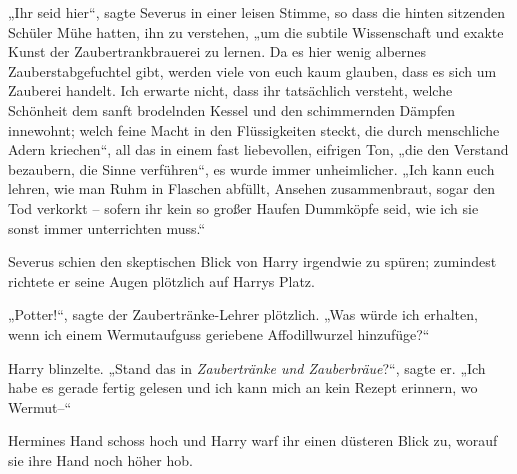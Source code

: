 „Ihr seid hier“, sagte Severus in einer leisen Stimme, so dass die hinten sitzenden Schüler Mühe hatten, ihn zu verstehen, „um die subtile Wissenschaft und exakte Kunst der Zaubertrankbrauerei zu lernen. Da es hier wenig albernes Zauberstabgefuchtel gibt, werden viele von euch kaum glauben, dass es sich um Zauberei handelt. Ich erwarte nicht, dass ihr tatsächlich versteht, welche Schönheit dem sanft brodelnden Kessel und den schimmernden Dämpfen innewohnt; welch feine Macht in den Flüssigkeiten steckt, die durch menschliche Adern kriechen“, all das in einem fast liebevollen, eifrigen Ton, „die den Verstand bezaubern, die Sinne verführen“, es wurde immer unheimlicher. „Ich kann euch lehren, wie man Ruhm in Flaschen abfüllt, Ansehen zusammenbraut, sogar den Tod verkorkt – sofern ihr kein so großer Haufen Dummköpfe seid, wie ich sie sonst immer unterrichten muss.“

Severus schien den skeptischen Blick von Harry irgendwie zu spüren; zumindest richtete er seine Augen plötzlich auf Harrys Platz.

„Potter!“, sagte der Zaubertränke-Lehrer plötzlich. „Was würde ich erhalten, wenn ich einem Wermutaufguss geriebene Affodillwurzel hinzufüge?“

Harry blinzelte. „Stand das in \emph{Zaubertränke und Zauberbräue}?“, sagte er. „Ich habe es gerade fertig gelesen und ich kann mich an kein Rezept erinnern, wo Wermut–“

Hermines Hand schoss hoch und Harry warf ihr einen düsteren Blick zu, worauf sie ihre Hand noch höher hob.

